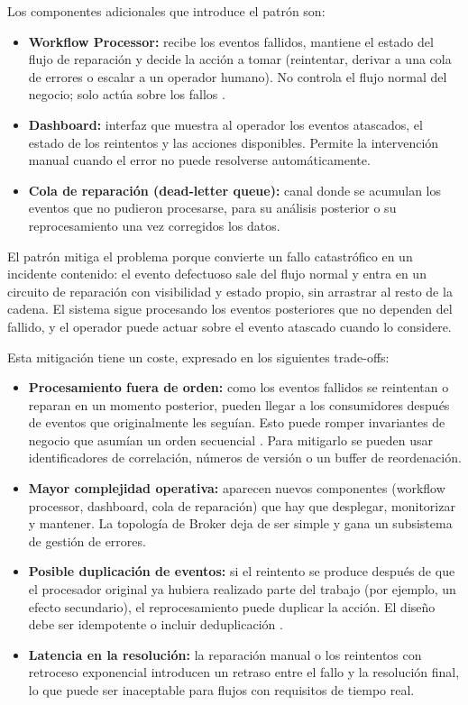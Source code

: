 Los componentes adicionales que introduce el patrón son:

\begin{itemize}
  \item \textbf{Workflow Processor:} recibe los eventos fallidos, mantiene el estado del flujo de reparación y decide la acción a tomar (reintentar, derivar a una cola de errores o escalar a un operador humano). No controla el flujo normal del negocio; solo actúa sobre los fallos \parencite{richards2020fundamentals}.
  \item \textbf{Dashboard:} interfaz que muestra al operador los eventos atascados, el estado de los reintentos y las acciones disponibles. Permite la intervención manual cuando el error no puede resolverse automáticamente.
  \item \textbf{Cola de reparación (dead-letter queue):} canal donde se acumulan los eventos que no pudieron procesarse, para su análisis posterior o su reprocesamiento una vez corregidos los datos.
\end{itemize}

El patrón mitiga el problema porque convierte un fallo catastrófico en un incidente contenido: el evento defectuoso sale del flujo normal y entra en un circuito de reparación con visibilidad y estado propio, sin arrastrar al resto de la cadena. El sistema sigue procesando los eventos posteriores que no dependen del fallido, y el operador puede actuar sobre el evento atascado cuando lo considere.

Esta mitigación tiene un coste, expresado en los siguientes trade-offs:

\begin{itemize}
  \item \textbf{Procesamiento fuera de orden:} como los eventos fallidos se reintentan o reparan en un momento posterior, pueden llegar a los consumidores después de eventos que originalmente les seguían. Esto puede romper invariantes de negocio que asumían un orden secuencial \parencite{ford2021hard}. Para mitigarlo se pueden usar identificadores de correlación, números de versión o un buffer de reordenación.
  \item \textbf{Mayor complejidad operativa:} aparecen nuevos componentes (workflow processor, dashboard, cola de reparación) que hay que desplegar, monitorizar y mantener. La topología de Broker deja de ser simple y gana un subsistema de gestión de errores.
  \item \textbf{Posible duplicación de eventos:} si el reintento se produce después de que el procesador original ya hubiera realizado parte del trabajo (por ejemplo, un efecto secundario), el reprocesamiento puede duplicar la acción. El diseño debe ser idempotente o incluir deduplicación \parencite{ford2021hard}.
  \item \textbf{Latencia en la resolución:} la reparación manual o los reintentos con retroceso exponencial introducen un retraso entre el fallo y la resolución final, lo que puede ser inaceptable para flujos con requisitos de tiempo real.
\end{itemize}


